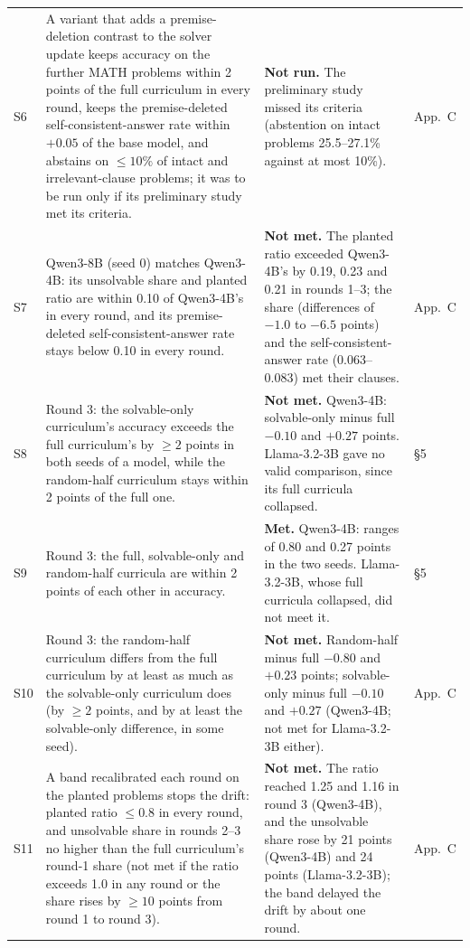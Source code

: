 \documentclass[10pt,a4paper]{article}
\newcommand{\met}{\textbf{Met.}}
\newcommand{\nmet}{\textbf{Not met.}}
\newcommand{\nrun}{\textbf{Not run.}}
\begin{document}
\begin{longtable}{@{}L{0.9cm}L{7.8cm}L{6.1cm}L{1.3cm}@{}}
S6 & A variant that adds a premise-deletion contrast to the solver update keeps accuracy on the further MATH problems within 2 points of the full curriculum in every round, keeps the premise-deleted self-consistent-answer rate within $+0.05$ of the base model, and abstains on $\le 10\%$ of intact and irrelevant-clause problems; it was to be run only if its preliminary study met its criteria. & \nrun{} The preliminary study missed its criteria (abstention on intact problems 25.5--27.1\% against at most 10\%). & App.~C \\
S7 & Qwen3-8B (seed 0) matches Qwen3-4B: its unsolvable share and planted ratio are within 0.10 of Qwen3-4B's in every round, and its premise-deleted self-consistent-answer rate stays below 0.10 in every round. & \nmet{} The planted ratio exceeded Qwen3-4B's by 0.19, 0.23 and 0.21 in rounds 1--3; the share (differences of $-1.0$ to $-6.5$ points) and the self-consistent-answer rate (0.063--0.083) met their clauses. & App.~C \\
S8 & Round 3: the solvable-only curriculum's accuracy exceeds the full curriculum's by $\ge 2$ points in both seeds of a model, while the random-half curriculum stays within 2 points of the full one. & \nmet{} Qwen3-4B: solvable-only minus full $-0.10$ and $+0.27$ points. Llama-3.2-3B gave no valid comparison, since its full curricula collapsed. & \S5 \\
S9 & Round 3: the full, solvable-only and random-half curricula are within 2 points of each other in accuracy. & \met{} Qwen3-4B: ranges of 0.80 and 0.27 points in the two seeds. Llama-3.2-3B, whose full curricula collapsed, did not meet it. & \S5 \\
S10 & Round 3: the random-half curriculum differs from the full curriculum by at least as much as the solvable-only curriculum does (by $\ge 2$ points, and by at least the solvable-only difference, in some seed). & \nmet{} Random-half minus full $-0.80$ and $+0.23$ points; solvable-only minus full $-0.10$ and $+0.27$ (Qwen3-4B; not met for Llama-3.2-3B either). & App.~C \\
S11 & A band recalibrated each round on the planted problems stops the drift: planted ratio $\le 0.8$ in every round, and unsolvable share in rounds 2--3 no higher than the full curriculum's round-1 share (not met if the ratio exceeds 1.0 in any round or the share rises by $\ge 10$ points from round 1 to round 3). & \nmet{} The ratio reached 1.25 and 1.16 in round 3 (Qwen3-4B), and the unsolvable share rose by 21 points (Qwen3-4B) and 24 points (Llama-3.2-3B); the band delayed the drift by about one round. & App.~C \\

\end{longtable}
\end{document}
